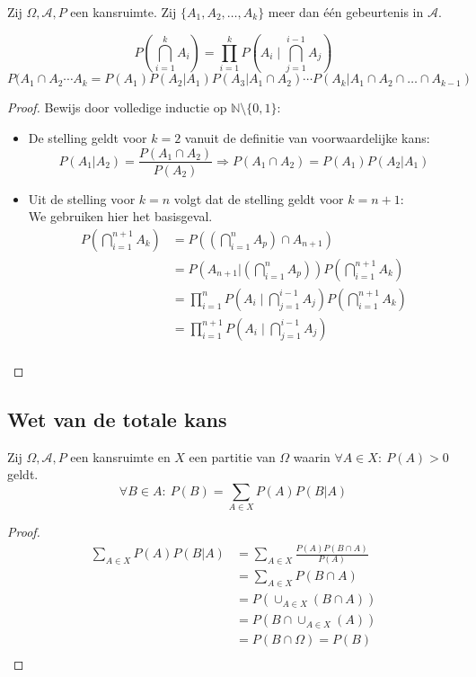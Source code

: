 \documentclass[main.tex]{subfiles}
\begin{document}
\begin{st}
  Zij $\Omega,\mathcal{A},P$ een kansruimte.
  Zij $\{ A_{1}, A_{2}, \dotsc, A_{k}\}$ meer dan \'e\'en gebeurtenis in $\mathcal{A}$.

  \[
  P\left(\bigcap_{i=1}^{k}A_{i}\right)
  = \prod_{i=1}^{k}P\left(A_{i}\mid\bigcap_{j=1}^{i-1}A_{j}\right)
  \]
  \[
  P(A_{1}\cap A_{2} \dotsb A_{k}
  = P(A_{1})P(A_{2}|A_{1})P(A_{3}|A_{1}\cap A_{2}) \dotsb P(A_{k}|A_{1}\cap A_{2}\cap \dotsc \cap A_{k-1})
  \]

  \begin{proof}
    Bewijs door volledige inductie op $\mathbb{N} \setminus \{0,1\}$:
    \begin{itemize}
    \item De stelling geldt voor $k=2$ vanuit de definitie van voorwaardelijke kans: 
      \[  P(A_{1}|A_{2}) = \frac{P(A_{1}\cap A_{2})}{P(A_{2})} \Rightarrow P(A_{1} \cap A_{2}) = P(A_{1}) P(A_{2}|A_{1}) \]
    \item Uit de stelling voor $k=n$ volgt dat de stelling geldt voor $k=n+1$:\\
      We gebruiken hier het basisgeval.
      \[ 
      \begin{array}{rl}
        P\left(\bigcap_{i=1}^{n+1}A_{k}\right)
        &= P\left(\left(\bigcap_{i=1}^{n}A_{p}\right) \cap A_{n+1} \right)\\
        &= P\left(A_{n+1} | \left(\bigcap_{i=1}^{n}A_{p}\right) \right) P\left(\bigcap_{i=1}^{n+1}A_{k}\right)\\
        &= \prod_{i=1}^{n}P\left(A_{i}\mid\bigcap_{j=1}^{i-1}A_{j}\right) P\left(\bigcap_{i=1}^{n+1}A_{k}\right)\\
        &= \prod_{i=1}^{n+1}P\left(A_{i}\mid\bigcap_{j=1}^{i-1}A_{j}\right)\\
      \end{array}
      \]
    \end{itemize}
  \end{proof}
\end{st}

\subsection{Wet van de totale kans}
\label{sec:wet-van-de}

\begin{st}
  Zij $\Omega,\mathcal{A},P$ een kansruimte en $X$ een partitie van $\Omega$ waarin $\forall A \in X:\ P(A) > 0$ geldt.
  \[ \forall B \in A:\ P(B) = \sum_{A\in X}P(A)P(B|A) \]
  \begin{proof}
    \[
    \begin{array}{rl}
      \sum_{A\in X}P(A)P(B|A)
      &= \sum_{A\in X}\frac{P(A)P(B \cap A)}{P(A)}\\
      &= \sum_{A\in X} P(B \cap A)\\
      &= P(\cup_{A\in X}(B \cap A))\\
      &= P(B \cap \cup_{A\in X}(A))\\
      &= P(B \cap \Omega) = P(B)\\
    \end{array}
    \]
  \end{proof}
\end{st}
\end{document}
